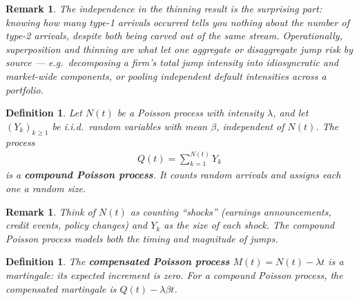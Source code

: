\documentclass{report}
\theoremstyle{spacedplain}
\theoremstyle{spaceddefinition}
\newtheorem{definition}[theorem]{Definition}
\theoremstyle{spacedremark}
\newtheorem{remark}[theorem]{Remark}
\begin{document}
\begin{remark}
The independence in the thinning result is the surprising part: knowing how many type-1 arrivals occurred tells you nothing about the number of type-2 arrivals, despite both being carved out of the same stream. Operationally, superposition and thinning are what let one aggregate or disaggregate jump risk by source --- e.g.\ decomposing a firm's total jump intensity into idiosyncratic and market-wide components, or pooling independent default intensities across a portfolio.
\end{remark}

\begin{definition}
Let $N(t)$ be a Poisson process with intensity $\lambda$, and let $(Y_k)_{k \geq 1}$ be i.i.d.\ random variables with mean $\beta$, independent of $N(t)$. The process
\begin{align}
    Q(t) = \sum_{k=1}^{N(t)} Y_k
\end{align}
is a \textbf{compound Poisson process}. It counts random arrivals and assigns each one a random size.
\end{definition}

\begin{remark}
Think of $N(t)$ as counting ``shocks'' (earnings announcements, credit events, policy changes) and $Y_k$ as the size of each shock. The compound Poisson process models both the timing and magnitude of jumps.
\end{remark}

\begin{definition}
The \textbf{compensated Poisson process} $M(t) = N(t) - \lambda t$ is a martingale: its expected increment is zero. For a compound Poisson process, the compensated martingale is $Q(t) - \lambda \beta t$.
\end{definition}
\end{document}
